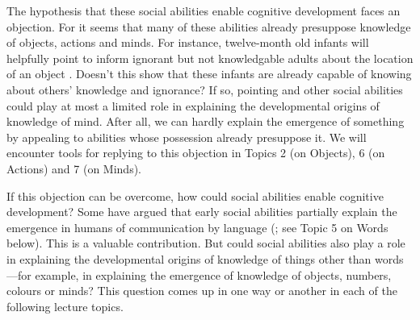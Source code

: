 \documentclass[12pt,\papersize]{extarticle}
\begin{document}
The hypothesis that these social abilities enable cognitive development faces an objection. 
For it seems that many of these abilities already presuppose  knowledge of objects, actions and minds. 
For instance, twelve-month old infants  will helpfully point to inform ignorant but not knowledgable adults about the location of an object  \citep{Liszkowski:2008al}.
Doesn't this show that these infants are already capable of knowing about others' knowledge and ignorance? 
If so, pointing and other social abilities could play at most a limited role in explaining the developmental origins of knowledge of mind. 
After all, we can hardly explain the emergence of something by appealing to abilities whose possession already presuppose it.
We will encounter tools for replying to this objection in Topics 2 (on Objects), 6 (on Actions) and 7 (on Minds).

If this objection can be overcome, how could social abilities enable cognitive development? 
Some have argued that early social abilities partially explain the emergence in humans of communication by language (\citealp{tomasello:2008origins}; see Topic 5 on Words below). 
This is a valuable contribution.  
But could social abilities also play a role in explaining the developmental origins of knowledge of things other than words---for example, in explaining the emergence of knowledge of objects, numbers, colours or minds? 
This question comes up in one way or another in each of the following lecture topics.
\end{document}
